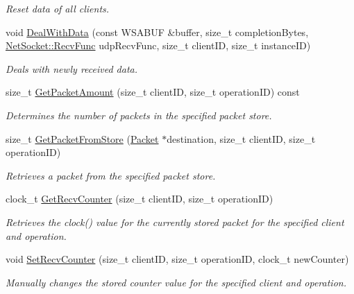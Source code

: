 \begin{DoxyCompactItemize}
\begin{DoxyCompactList}\small\item\em Reset data of all clients. \item\end{DoxyCompactList}\item 
void \hyperlink{class_net_mode_udp_per_client_a0d7d2c68e11b088b743069d3848a13f0}{DealWithData} (const WSABUF \&buffer, size\_\-t completionBytes, \hyperlink{class_net_socket_a52b5f4de8d0a47fd8620f542b21c076c}{NetSocket::RecvFunc} udpRecvFunc, size\_\-t clientID, size\_\-t instanceID)
\begin{DoxyCompactList}\small\item\em Deals with newly received data. \item\end{DoxyCompactList}\item 
size\_\-t \hyperlink{class_net_mode_udp_per_client_ac4e6ad2bcfa272cabb43a13d7baef626}{GetPacketAmount} (size\_\-t clientID, size\_\-t operationID) const 
\begin{DoxyCompactList}\small\item\em Determines the number of packets in the specified packet store. \item\end{DoxyCompactList}\item 
size\_\-t \hyperlink{class_net_mode_udp_per_client_a37e093c98724f8a8e652360664a6c9e4}{GetPacketFromStore} (\hyperlink{class_packet}{Packet} $\ast$destination, size\_\-t clientID, size\_\-t operationID)
\begin{DoxyCompactList}\small\item\em Retrieves a packet from the specified packet store. \item\end{DoxyCompactList}\item 
clock\_\-t \hyperlink{class_net_mode_udp_per_client_a73732a27744817cdccebfef4d7b53aa7}{GetRecvCounter} (size\_\-t clientID, size\_\-t operationID)
\begin{DoxyCompactList}\small\item\em Retrieves the clock() value for the currently stored packet for the specified client and operation. \item\end{DoxyCompactList}\item 
void \hyperlink{class_net_mode_udp_per_client_a6f4bc37fafcb1affa58c4b9820189d81}{SetRecvCounter} (size\_\-t clientID, size\_\-t operationID, clock\_\-t newCounter)
\begin{DoxyCompactList}\small\item\em Manually changes the stored counter value for the specified client and operation. \item\end{DoxyCompactList}\item 

\end{DoxyCompactItemize}

